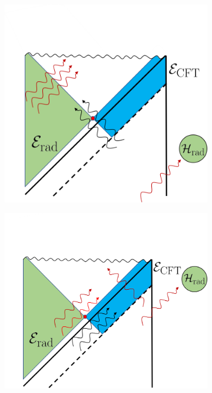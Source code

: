 \documentclass[11pt,a4paper]{article}
\begin{document}
\begin{figure} [t]
\centering
\vspace{-1cm}
\begin{subfigure}{.48\textwidth}
  \centering
 \includegraphics[width = 0.8\linewidth]{ReflectedModes.png}
\end{subfigure}
\begin{subfigure}{.48\textwidth}
 \includegraphics[width = 0.87\linewidth]{ReflectedModesOutgoing.png}
 \centering


\end{subfigure}
\end{figure}
\end{document}
